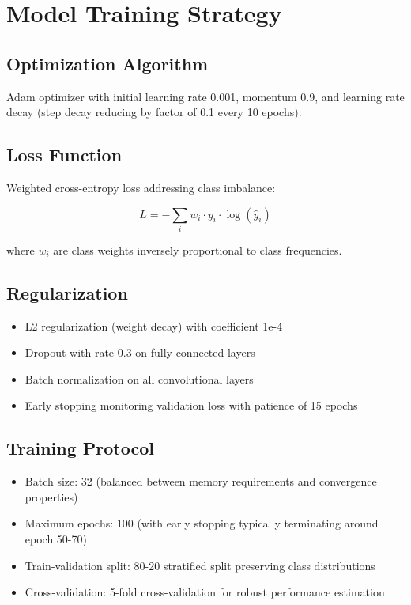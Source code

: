 {\section{Model Training Strategy}

\subsection{Optimization Algorithm}

Adam optimizer with initial learning rate 0.001, momentum 0.9, and learning rate decay (step decay reducing by factor of 0.1 every 10 epochs).

\subsection{Loss Function}

Weighted cross-entropy loss addressing class imbalance:

\begin{equation}
L = -\sum_i w_i \cdot y_i \cdot \log(\hat{y}_i)
\end{equation}

where $w_i$ are class weights inversely proportional to class frequencies.

\subsection{Regularization}

\begin{itemize}
    \item L2 regularization (weight decay) with coefficient 1e-4
    \item Dropout with rate 0.3 on fully connected layers
    \item Batch normalization on all convolutional layers
    \item Early stopping monitoring validation loss with patience of 15 epochs
\end{itemize}

\subsection{Training Protocol}

\begin{itemize}
    \item Batch size: 32 (balanced between memory requirements and convergence properties)
    \item Maximum epochs: 100 (with early stopping typically terminating around epoch 50-70)
    \item Train-validation split: 80-20 stratified split preserving class distributions
    \item Cross-validation: 5-fold cross-validation for robust performance estimation
\end{itemize}

}
